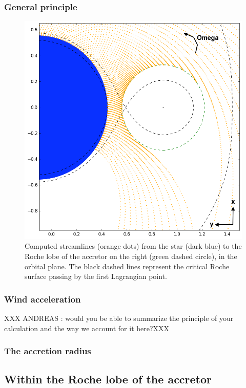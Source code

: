 \documentclass[a4paper,fleqn,usenatbib]{mnras}
\begin{document}
\subsubsection{General principle}
\label{sec:pple}

\begin{figure}
\centering
\includegraphics[width=0.9\columnwidth]{Pictures/big_picture.png}
\caption{Computed streamlines (orange dots) from the star (dark blue) to the Roche lobe of the accretor on the right (green dashed circle), in the orbital plane. The black dashed lines represent the critical Roche surface passing by the first Lagrangian point.}
\label{fig:big_picture}
\end{figure} 


\subsubsection{Wind acceleration}
\label{sec:wind_acc}
XXX ANDREAS : would you be able to summarize the principle of your calculation and the way we account for it here?XXX 

\subsubsection{The accretion radius}
\label{sec:acc_rad}

\subsection{Within the Roche lobe of the accretor}
\label{sec:Roche_lobe}
\end{document}
